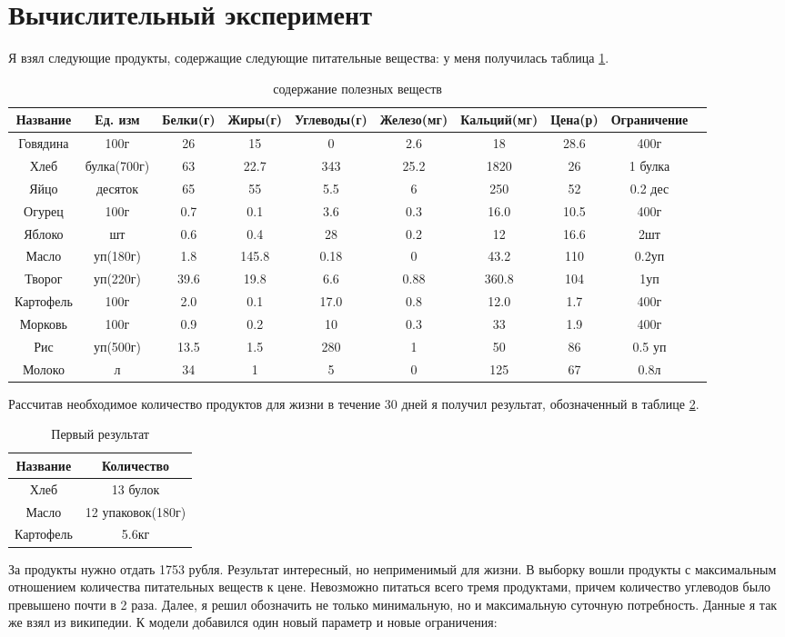 \documentclass[]{article}
\begin{document}
\section{Вычислительный эксперимент}
Я взял следующие продукты, содержащие следующие питательные вещества:
у меня получилась таблица \ref{tab:1}.
\begin{table}\caption{содержание полезных веществ}\label{tab:1}
\centering
\begin{tabular}{|c|c|c|c|c|c|c|c|c|c|}
\hline
Название & Ед. изм & Белки(г) & Жиры(г) & Углеводы(г) & Железо(мг) & Кальций(мг) & Цена(р) & Ограничение\\
\hline
Говядина & 100г & 26 & 15 & 0 & 2.6 & 18 & 28.6 & 400г\\
\hline
Хлеб & булка(700г) & 63 & 22.7& 343 & 25.2 & 1820 & 26 & 1 булка\\
\hline
Яйцо & десяток & 65 & 55 & 5.5 & 6 & 250 & 52 & 0.2 дес\\
\hline
Огурец & 100г & 0.7 & 0.1 & 3.6 & 0.3 & 16.0 & 10.5 & 400г \\
\hline
Яблоко & шт & 0.6 & 0.4 & 28 & 0.2 & 12 & 16.6 & 2шт\\
\hline
Масло & уп(180г) & 1.8 & 145.8 & 0.18 & 0 & 43.2 & 110 & 0.2уп\\
\hline
Творог & уп(220г) & 39.6 & 19.8 & 6.6 & 0.88 & 360.8 & 104 & 1уп\\
\hline
Картофель & 100г & 2.0 & 0.1 & 17.0 & 0.8 & 12.0 & 1.7 & 400г\\
\hline
Морковь & 100г & 0.9 & 0.2 & 10 & 0.3 & 33 & 1.9 & 400г\\
\hline
Рис & уп(500г) & 13.5 & 1.5 & 280 & 1 & 50 &86 & 0.5 уп\\
\hline
Молоко & л & 34 & 1 & 5 & 0 &125 & 67 & 0.8л\\
\hline
\end{tabular}
\end{table}


Рассчитав необходимое количество продуктов для жизни в течение 30 дней я получил результат, обозначенный в таблице \ref{tab:2}.
\begin{table}
	\caption{Первый результат}
	\centering
	\label{tab:2}
	\begin{tabular}{|c|c|}
		\hline
		Название&Количество\\
		\hline
		Хлеб & 13 булок\\
		\hline
		Масло & 12 упаковок(180г)\\
		\hline
		Картофель & 5.6кг\\
		\hline
	\end{tabular}

\end{table}
За продукты нужно отдать 1753 рубля. Результат интересный, но неприменимый для жизни.  В выборку вошли продукты с
максимальным отношением количества питательных веществ к цене. Невозможно питаться всего тремя продуктами,
причем количество углеводов было превышено почти в 2 раза. Далее, я решил обозначить не только минимальную,
но и максимальную суточную потребность. Данные я так же взял из википедии. К модели добавился один новый параметр и
новые ограничения:
\end{document}
